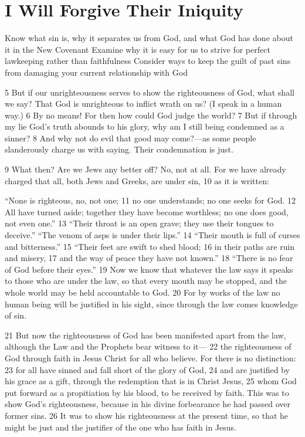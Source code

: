 \chapter{I Will Forgive Their Iniquity}

\begin{goals}
\goal Know what sin is, why it separates us from God, and what God has done about it in the New Covenant
\goal Examine why it is easy for us to strive for perfect lawkeeping rather than faithfulness
\goal Consider ways to keep the guilt of past sins from damaging your current relationship with God
\end{goals}

\begin{bible}
5 But if our unrighteousness serves to show the righteousness of God, what shall we say? That God is unrighteous to inflict wrath on us? (I speak in a human way.) 6 By no means! For then how could God judge the world? 7 But if through my lie God's truth abounds to his glory, why am I still being condemned as a sinner? 8 And why not do evil that good may come?—as some people slanderously charge us with saying. Their condemnation is just.

9 What then? Are we Jews any better off? No, not at all. For we have already charged that all, both Jews and Greeks, are under sin, 10 as it is written:

``None is righteous, no, not one;
11     no one understands;
    no one seeks for God.
12 All have turned aside; together they have become worthless;
    no one does good,
    not even one.''
13 ``Their throat is an open grave;
    they use their tongues to deceive.''
``The venom of asps is under their lips.''
14     ``Their mouth is full of curses and bitterness.''
15 ``Their feet are swift to shed blood;
16     in their paths are ruin and misery,
17 and the way of peace they have not known.''
18     ``There is no fear of God before their eyes.''
19 Now we know that whatever the law says it speaks to those who are under the law, so that every mouth may be stopped, and the whole world may be held accountable to God. 20 For by works of the law no human being will be justified in his sight, since through the law comes knowledge of sin.

21 But now the righteousness of God has been manifested apart from the law, although the Law and the Prophets bear witness to it— 22 the righteousness of God through faith in Jesus Christ for all who believe. For there is no distinction: 23 for all have sinned and fall short of the glory of God, 24 and are justified by his grace as a gift, through the redemption that is in Christ Jesus, 25 whom God put forward as a propitiation by his blood, to be received by faith. This was to show God's righteousness, because in his divine forbearance he had passed over former sins. 26 It was to show his righteousness at the present time, so that he might be just and the justifier of the one who has faith in Jesus.


\end{bible}
